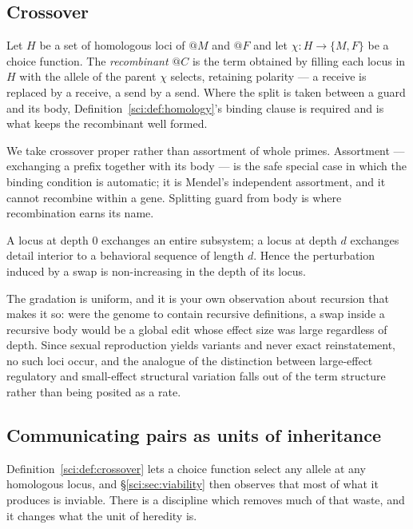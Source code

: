 \subsection{Crossover}\label{sci:S12.4}

\begin{definition}[Crossover]
\label{sci:def:crossover}
Let $H$ be a set of homologous loci of $@M$ and $@F$ and let $\chi : H \to \{M, F\}$ be a choice
function. The \emph{recombinant} $@C$ is the term obtained by filling each locus in $H$ with the
allele of the parent $\chi$ selects, retaining polarity --- a receive is replaced by a receive, a send
by a send. Where the split is taken between a guard and its body, Definition~\ref{sci:def:homology}'s
binding clause is required and is what keeps the recombinant well formed.
\end{definition}

We take crossover proper rather than assortment of whole primes. Assortment --- exchanging a prefix
together with its body --- is the safe special case in which the binding condition is automatic; it is
Mendel's independent assortment, and it cannot recombine within a gene. Splitting guard from body is
where recombination earns its name.

\begin{proposition}
\label{sci:prop:depthgrade}
A locus at depth $0$ exchanges an entire subsystem; a locus at depth $d$ exchanges detail interior to
a behavioral sequence of length $d$. Hence the perturbation induced by a swap is non-increasing in
the depth of its locus.
\end{proposition}

The gradation is uniform, and it is your own observation about recursion that makes it so: were the
genome to contain recursive definitions, a swap inside a recursive body would be a global edit whose
effect size was large regardless of depth. Since sexual reproduction yields variants and never exact
reinstatement, no such loci occur, and the analogue of the distinction between large-effect regulatory
and small-effect structural variation falls out of the term structure rather than being posited as a
rate.

\subsection{Communicating pairs as units of inheritance}\label{sci:S12.5}
\label{sci:sec:pairs}

Definition~\ref{sci:def:crossover} lets a choice function select any allele at any homologous locus, and
\S\ref{sci:sec:viability} then observes that most of what it produces is inviable. There is a discipline
which removes much of that waste, and it changes what the unit of heredity is.

